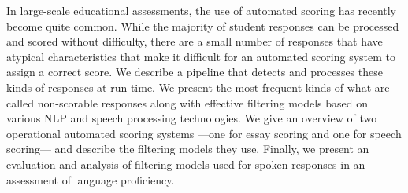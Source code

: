 In large-scale educational assessments, the use of automated scoring has recently become quite common. While the majority of student responses can be processed and scored without difficulty, there are a small number of responses that have atypical characteristics that make it difficult for an automated scoring system to assign a correct score. We describe a pipeline that detects and processes these kinds of responses at run-time. We present the most frequent kinds of what are called non-scorable responses along with effective filtering models based on various NLP and speech processing technologies. We give an overview of two operational automated scoring systems ---one for essay scoring and one for speech scoring--- and describe the filtering models they use. Finally, we present an evaluation and analysis of filtering models used for spoken responses in an assessment of language proficiency.
